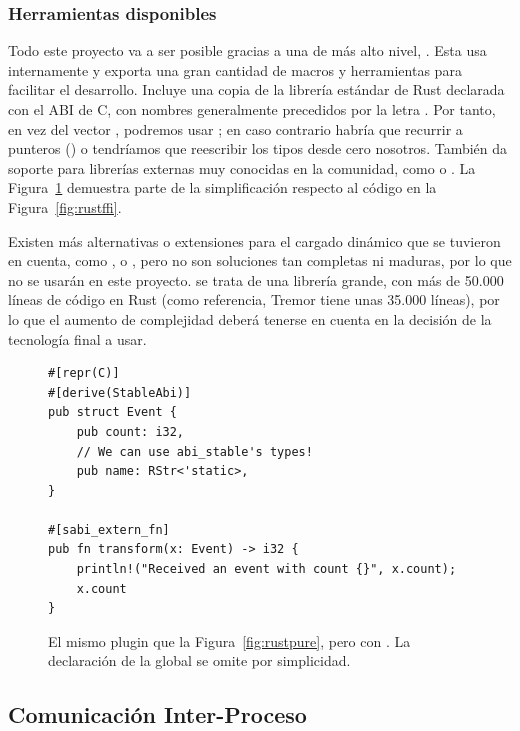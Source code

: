 \subsubsection{Herramientas disponibles}

Todo este proyecto va a ser posible gracias a una \crate de más alto nivel,
. Esta usa  internamente y exporta una
gran cantidad de macros y herramientas para facilitar el desarrollo. Incluye una
copia de la librería estándar de Rust declarada con el ABI de C, con nombres
generalmente precedidos por la letra . Por tanto, en vez del vector
, podremos usar ; en caso contrario habría que
recurrir a punteros () o tendríamos que reescribir los tipos
desde cero nosotros. También da soporte para librerías externas muy conocidas en
la comunidad, como  o . La
Figura~\ref{fig:rustabi_stable} demuestra parte de la simplificación respecto al
código en la Figura~\ref{fig:rustffi}.

Existen más alternativas o extensiones para el cargado dinámico que se tuvieron
en cuenta, como ,  o , pero
no son soluciones tan completas ni maduras, por lo que no se usarán en este
proyecto. \abistable se trata de una librería grande, con más de 50.000 líneas
de código en Rust (como referencia, Tremor tiene unas 35.000 líneas), por lo que
el aumento de complejidad deberá tenerse en cuenta en la decisión de la
tecnología final a usar.

\begin{figure}
    \centering
    \begin{verbatim}
#[repr(C)]
#[derive(StableAbi)]
pub struct Event {
    pub count: i32,
    // We can use abi_stable's types!
    pub name: RStr<'static>,
}

#[sabi_extern_fn]
pub fn transform(x: Event) -> i32 {
    println!("Received an event with count {}", x.count);
    x.count
}
    \end{verbatim}

    \caption{El mismo plugin que la Figura~\ref{fig:rustpure}, pero con
        \abistable. La declaración de la global  se omite por
        simplicidad.}%
    \label{fig:rustabi_stable}
\end{figure}

\subsection{Comunicación Inter-Proceso}

